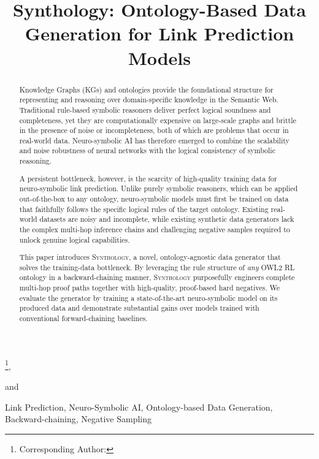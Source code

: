 \documentclass{IOS-Book-Article}     %
\begin{document}
\pagestyle{plain}
\begin{frontmatter}          %
	\title{Synthology: Ontology-Based Data Generation for Link Prediction Models}

	\author[A]{ }%
	\thanks{Corresponding Author: },
	\author[B]{ } and
	\author[C]{ }
	\address{Department of Computer Science, KU Leuven campus Kulak Kortrijk}



	\begin{abstract}
		Knowledge Graphs (KGs) and ontologies provide the foundational structure for representing and reasoning over domain-specific knowledge in the Semantic Web. Traditional rule-based symbolic reasoners deliver perfect logical soundness and completeness, yet they are computationally expensive on large-scale graphs and brittle in the presence of noise or incompleteness, both of which are problems that occur in real-world data. Neuro-symbolic AI has therefore emerged to combine the scalability and noise robustness of neural networks with the logical consistency of symbolic reasoning.

		A persistent bottleneck, however, is the scarcity of high-quality training data for neuro-symbolic link prediction. Unlike purely symbolic reasoners, which can be applied out-of-the-box to any ontology, neuro-symbolic models must first be trained on data that faithfully follows the specific logical rules of the target ontology. Existing real-world datasets are noisy and incomplete, while existing synthetic data generators lack the complex multi-hop inference chains and challenging negative samples required to unlock genuine logical capabilities.

		This paper introduces \textsc{Synthology}, a novel, ontology-agnostic data generator that solves the training-data bottleneck. By leveraging the rule structure of \textit{any} OWL2 RL ontology in a backward-chaining manner, \textsc{Synthology} purposefully engineers complete multi-hop proof paths together with high-quality, proof-based hard negatives. We evaluate the generator by training a state-of-the-art neuro-symbolic model on its produced data and demonstrate substantial gains over models trained with conventional forward-chaining baselines.
	\end{abstract}

	\begin{keyword}
		Link Prediction, Neuro-Symbolic AI, Ontology-based Data Generation, Backward-chaining, Negative Sampling
	\end{keyword}

\end{frontmatter}
\end{document}
